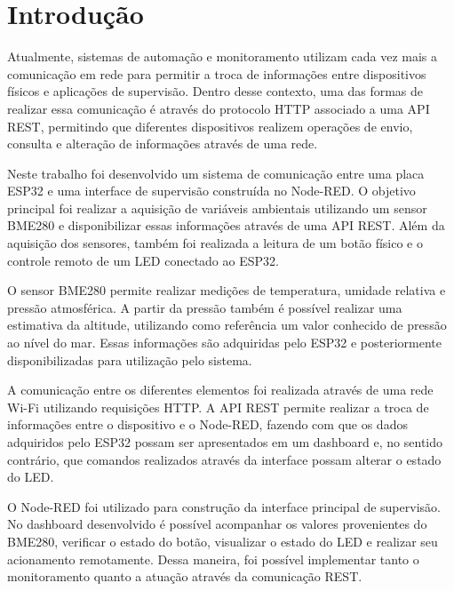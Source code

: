 
\section{Introdução}
\label{sec:introducao}

Atualmente, sistemas de automação e monitoramento utilizam cada vez mais a comunicação em rede para permitir a troca de informações entre dispositivos físicos e aplicações de supervisão. Dentro desse contexto, uma das formas de realizar essa comunicação é através do protocolo HTTP associado a uma API REST, permitindo que diferentes dispositivos realizem operações de envio, consulta e alteração de informações através de uma rede.

Neste trabalho foi desenvolvido um sistema de comunicação entre uma placa ESP32 e uma interface de supervisão construída no Node-RED. O objetivo principal foi realizar a aquisição de variáveis ambientais utilizando um sensor BME280 e disponibilizar essas informações através de uma API REST. Além da aquisição dos sensores, também foi realizada a leitura de um botão físico e o controle remoto de um LED conectado ao ESP32.

O sensor BME280 permite realizar medições de temperatura, umidade relativa e pressão atmosférica. A partir da pressão também é possível realizar uma estimativa da altitude, utilizando como referência um valor conhecido de pressão ao nível do mar. Essas informações são adquiridas pelo ESP32 e posteriormente disponibilizadas para utilização pelo sistema.

A comunicação entre os diferentes elementos foi realizada através de uma rede Wi-Fi utilizando requisições HTTP. A API REST permite realizar a troca de informações entre o dispositivo e o Node-RED, fazendo com que os dados adquiridos pelo ESP32 possam ser apresentados em um dashboard e, no sentido contrário, que comandos realizados através da interface possam alterar o estado do LED.

O Node-RED foi utilizado para construção da interface principal de supervisão. No dashboard desenvolvido é possível acompanhar os valores provenientes do BME280, verificar o estado do botão, visualizar o estado do LED e realizar seu acionamento remotamente. Dessa maneira, foi possível implementar tanto o monitoramento quanto a atuação através da comunicação REST.

